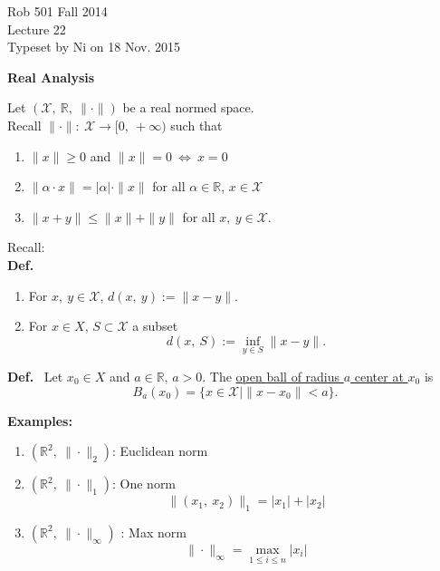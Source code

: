 \documentclass[letterpaper]{article}
\newcommand{\real}{\mathbb R}  %
\begin{document}
\baselineskip=48pt  %


\setlength{\parskip}{.3in}
\setlength{\itemsep}{.3in}

\pagestyle{plain}

{\Large \bf
\begin{center}
Rob 501 Fall 2014\\
Lecture 22\\
Typeset by Ni on 18 Nov. 2015
\end{center}
}

\Large

\begin{center}
    \textbf{Real Analysis}
\end{center}

\noindent Let $(\mathcal{X},\ \real,\ \|\cdot\|)$ be a real normed space.\\
Recall $\|\cdot\|:\ \mathcal{X}\rightarrow[0,\ +\infty)$ such that
    \begin{enumerate}
        \item $\|x\|\geq 0$ and $\|x\|=0\ \Leftrightarrow\ x=0$
        \item $\|\alpha\cdot x\|=|\alpha|\cdot\|x\|$ for all $\alpha\in\real$, $x\in\mathcal{X}$
        \item $\|x+y\|\leq\|x\|+\|y\|$ for all $x,\ y\in\mathcal{X}$.
    \end{enumerate}
Recall:\\
\textbf{Def.}
    \begin{enumerate}
        \item For $x,\ y\in\mathcal{X}$, $d(x,\ y):=\|x-y\|$.
        \item For $x\in X$, $S\subset\mathcal{X}$ a subset
            \begin{equation*}
                d(x,\ S):=\inf_{y\in S}\|x-y\|.
            \end{equation*}
    \end{enumerate}

\noindent \textbf{Def.}~ Let $x_0\in X$ and $a\in\real$, $a>0$. The \underline{open ball of radius $a$ center at $x_0$} is
    \begin{equation*}
        B_a(x_0)=\{x\in\mathcal{X}|\|x-x_0\|<a\}.
    \end{equation*}

\noindent \textbf{Examples:}~
    \begin{enumerate}
        \item $\left(\real^2,\ \|\cdot\|_2\right)$: Euclidean norm
        \item $\left(\real^2,\ \|\cdot\|_1\right)$: One norm
            \begin{equation*}
                \|(x_1,\ x_2)\|_1=|x_1|+|x_2|
            \end{equation*}
        \item $\left(\real^2,\ \|\cdot\|_\infty\right)$ : Max norm
            \begin{equation*}
                \|\cdot\|_\infty=\max_{1\leq i\leq n}|x_i|
            \end{equation*}
    \end{enumerate}
\end{document}
